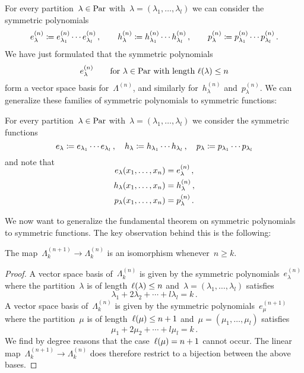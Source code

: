 \documentclass[a4paper,11pt]{scrartcl}
\begin{document}
For every partition~$\lambda \in \mathrm{Par}$ with~$\lambda = (\lambda_1, \dotsc, \lambda_l)$ we can consider the symmetric polynomials
\[
  e^{(n)}_\lambda
  \coloneqq
  e^{(n)}_{\lambda_1} \dotsm e^{(n)}_{\lambda_l} \,,
  \qquad
  h^{(n)}_\lambda
  \coloneqq
  h^{(n)}_{\lambda_1} \dotsm h^{(n)}_{\lambda_l} \,,
  \qquad
  p^{(n)}_\lambda
  \coloneqq
  p^{(n)}_{\lambda_1} \dotsm p^{(n)}_{\lambda_l} \,.
\]
We have just formulated that the symmetric polynomials
\[
  e^{(n)}_\lambda
  \qquad
  \text{for $\lambda \in \mathrm{Par}$ with length~$\ell(\lambda) \leq n$}
\]
form a vector space basis for~$\Lambda^{(n)}$, and similarly for~$h^{(n)}_\lambda$ and~$p^{(n)}_\lambda$.
We can generalize these families of symmetric polynomials to symmetric functions:

\begin{example}
  For every partition~$\lambda \in \mathrm{Par}$ with~$\lambda = (\lambda_1, \dotsc, \lambda_l)$ we consider the symmetric functions
  \[
    e_\lambda
    \coloneqq
    e_{\lambda_1} \dotsm e_{\lambda_l} \,,
    \quad
    h_\lambda
    \coloneqq
    h_{\lambda_1} \dotsm h_{\lambda_l} \,,
    \quad
    p_\lambda
    \coloneqq
    p_{\lambda_1} \dotsm p_{\lambda_l}
  \]
  and note that
  \begin{align*}
    \SwapAboveDisplaySkip
    e_\lambda(x_1, \dotsc, x_n)
    &=
    e^{(n)}_\lambda \,,
    \\
    h_\lambda(x_1, \dotsc, x_n)
    &=
    h^{(n)}_\lambda \,,
    \\
    p_\lambda(x_1, \dotsc, x_n)
    &=
    p^{(n)}_\lambda \,.
  \end{align*}
\end{example}

We now want to generalize the fundamental theorem on symmetric polynomials to symmetric functions.
The key observation behind this is the following:

\begin{proposition}
  \label{sequence stabilizes}
  The map~$\Lambda^{(n+1)}_k \to \Lambda^{(n)}_k$ is an isomorphism whenever~$n \geq k$. 
\end{proposition}

\begin{proof}
  A vector space basis of~$\Lambda^{(n)}_k$ is given by the symmetric polynomials~$e^{(n)}_\lambda$ where the partition~$\lambda$ is of length~$\ell(\lambda) \leq n$ and~$\lambda = (\lambda_1, \dotsc, \lambda_l)$ satisfies
  \[
    \lambda_1 + 2 \lambda_2 + \dotsb + l \lambda_l = k \,.
  \]
  A vector space basis of~$\Lambda^{(n)}_k$ is given by the symmetric polynomials~$e^{(n+1)}_\mu$ where the partition~$\mu$ is of length~$\ell(\mu) \leq n+1$ and~$\mu = (\mu_1, \dotsc, \mu_l)$ satisfies
  \[
    \mu_1 + 2 \mu_2 + \dotsb + l \mu_l = k \,.
  \]
  We find by degree reasons that the case~$\ell(\mu) = n+1$ cannot occur.
  The linear map~$\Lambda^{(n+1)}_k \to \Lambda^{(n)}_k$ does therefore restrict to a bijection between the above bases.
\end{proof}
\end{document}

